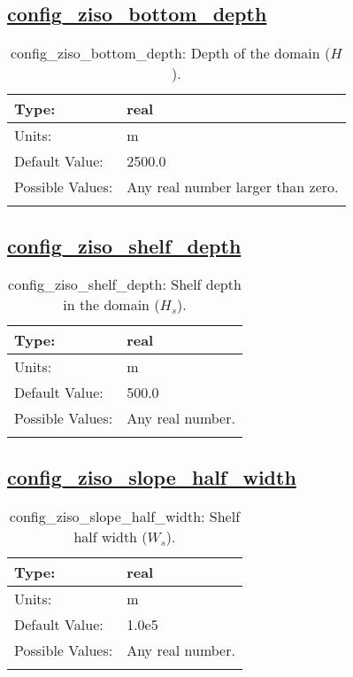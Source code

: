 \subsection[config\_ziso\_bottom\_depth]{\hyperref[sec:nm_tab_ziso]{config\_ziso\_bottom\_depth}}
\label{subsec:nm_sec_config_ziso_bottom_depth}
\begin{center}
\begin{longtable}{| p{2.0in} || p{4.0in} |}
    \hline
    Type: & real \\
    \hline
    Units: & \si{m} \\
    \hline
    Default Value: & 2500.0 \\
    \hline
    Possible Values: & Any real number larger than zero. \\
    \hline
    \caption{config\_ziso\_bottom\_depth: Depth of the domain ($H$).}
\end{longtable}
\end{center}
\subsection[config\_ziso\_shelf\_depth]{\hyperref[sec:nm_tab_ziso]{config\_ziso\_shelf\_depth}}
\label{subsec:nm_sec_config_ziso_shelf_depth}
\begin{center}
\begin{longtable}{| p{2.0in} || p{4.0in} |}
    \hline
    Type: & real \\
    \hline
    Units: & \si{m} \\
    \hline
    Default Value: & 500.0 \\
    \hline
    Possible Values: & Any real number. \\
    \hline
    \caption{config\_ziso\_shelf\_depth: Shelf depth in the domain ($H_s$).}
\end{longtable}
\end{center}
\subsection[config\_ziso\_slope\_half\_width]{\hyperref[sec:nm_tab_ziso]{config\_ziso\_slope\_half\_width}}
\label{subsec:nm_sec_config_ziso_slope_half_width}
\begin{center}
\begin{longtable}{| p{2.0in} || p{4.0in} |}
    \hline
    Type: & real \\
    \hline
    Units: & \si{m} \\
    \hline
    Default Value: & 1.0e5 \\
    \hline
    Possible Values: & Any real number. \\
    \hline
    \caption{config\_ziso\_slope\_half\_width: Shelf half width ($W_s$).}
\end{longtable}
\end{center}
